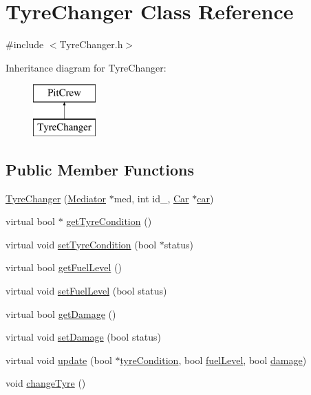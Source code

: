 \hypertarget{class_tyre_changer}{}\section{Tyre\+Changer Class Reference}
\label{class_tyre_changer}


{\ttfamily \#include $<$Tyre\+Changer.\+h$>$}

Inheritance diagram for Tyre\+Changer\+:\begin{figure}[H]
\begin{center}
\leavevmode
\includegraphics[height=2.000000cm]{class_tyre_changer}
\end{center}
\end{figure}
\subsection*{Public Member Functions}
\begin{DoxyCompactItemize}
\item 
\mbox{\hyperlink{class_tyre_changer_ad1c0e1f17ef376d29b48b3a1849a4f9b}{Tyre\+Changer}} (\mbox{\hyperlink{class_mediator}{Mediator}} $\ast$med, int id\+\_\+, \mbox{\hyperlink{class_car}{Car}} $\ast$\mbox{\hyperlink{class_pit_crew_ae2d97d82c1ae7061faf9b053329772e5}{car}})
\item 
virtual bool $\ast$ \mbox{\hyperlink{class_tyre_changer_afdd2bc9ac35d7e5449a9e0c5ee39b450}{get\+Tyre\+Condition}} ()
\item 
virtual void \mbox{\hyperlink{class_tyre_changer_a1a0df7cbe3bd488bdc54fd1e14fefd1b}{set\+Tyre\+Condition}} (bool $\ast$status)
\item 
virtual bool \mbox{\hyperlink{class_tyre_changer_ad369d1e8e5e356b297c904be374b045c}{get\+Fuel\+Level}} ()
\item 
virtual void \mbox{\hyperlink{class_tyre_changer_a22ba050947a3cea4372fc574d6fae910}{set\+Fuel\+Level}} (bool status)
\item 
virtual bool \mbox{\hyperlink{class_tyre_changer_ac0ad98b08d6016010a6bfed58442b78c}{get\+Damage}} ()
\item 
virtual void \mbox{\hyperlink{class_tyre_changer_ac89db968d57e823330886acbabb65b32}{set\+Damage}} (bool status)
\item 
virtual void \mbox{\hyperlink{class_tyre_changer_ad48ea41135a817264c940169a9cbef68}{update}} (bool $\ast$\mbox{\hyperlink{class_pit_crew_add6d2560b553a1359bfb68a6a4d80332}{tyre\+Condition}}, bool \mbox{\hyperlink{class_pit_crew_ad45840fa02b11a128e069ffcc7fdde47}{fuel\+Level}}, bool \mbox{\hyperlink{class_pit_crew_aa87241e1f87a430e1a92ed7010ccf554}{damage}})
\item 
void \mbox{\hyperlink{class_tyre_changer_aaa9c2d0249f50dd8da54e4af8e85835b}{change\+Tyre}} ()
\end{DoxyCompactItemize}
